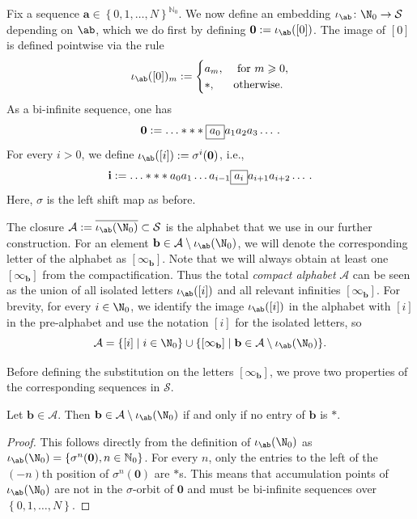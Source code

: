 %
%
%
%


Fix a sequence $\mathbf a\in \left\{0,1,\ldots,N\right\}^{\mathbb{N}_0}$. We now define an embedding $\iota_{\ab}\colon \N_0\to \mathcal{S}$ depending on $\ab$, which we do first by defining $\mathbf 0:=\iota_{\ab}([0])$. The image of $[0]$ is defined pointwise via the rule
\[
\iota_{\ab}([0])_m:=\begin{cases}
a_m,& \text{ for } m\geqslant 0, \\
*,& \text{otherwise}.
\end{cases}
\]
As a bi-infinite sequence, one has 
$$\mathbf 0:=\ldots ***\fbox{$a_0$}a_1a_2a_3\ldots\,.$$  For every $i>0$, we define $\iota_{\ab}([i]):=\sigma^{i}(\mathbf 0)$, i.e., 
$$\mathbf i:=\ldots ***a_0a_1\ldots a_{i-1}\fbox{$a_i$}a_{i+1}a_{i+2}\ldots\,.$$
Here, $\sigma$ is the left shift map as before. 

The closure $\mathcal{A}:=\overline{\iota_{\ab}(\N_0)} \subset \mathcal S$ is the alphabet that we use in our further construction. For an element $\mathbf b\in \mathcal{A}\setminus \iota_{\ab}(\N_0)$, we will denote the corresponding letter of the alphabet as $[\infty_\mathbf b]$. Note that we will always obtain at least one $[\infty_{\mathbf b}]$ from the compactification. Thus the total {\it compact alphabet} $\mathcal{A}$ can be seen as the union of all isolated letters $\iota_{\ab}([i])$ and all relevant infinities $[\infty_\mathbf b]$. For brevity, for every $i\in \N_0$, we identify the image $\iota_{\ab}([i])$ in the alphabet with $[i]$ in the pre-alphabet and use the notation $[i]$ for the isolated letters, so 
$$\mathcal{A}=\{[i]\mid i\in \N_0\}\cup \{[\infty_\mathbf b]\mid\mathbf b\in \mathcal{A}\setminus \iota_{\ab}(\N_0)\}.$$

Before defining the substitution on the letters $[\infty_\mathbf b]$, we prove two properties of the corresponding sequences in $\mathcal S$.

\begin{lem}\label{lem:nostar}
Let $\mathbf{b}\in \mathcal{A}$. 
Then $\mathbf b\in \mathcal{A}\setminus \iota_{\ab}(\N_0)$ if and only if no entry of $\mathbf b$ is $*$.
\end{lem}
\begin{proof}
This follows directly from the definition of $\iota_{\ab}(\N_0)$ as $\iota_{\ab}(\N_0)=\left\{\sigma^{n}(\mathbf{0}),n\in\mathbb{N}_0\right\}$. For every $n$, only the entries to the left of the $(-n)$th position of $\sigma^n(\mathbf 0)$ are $*$s. This means that accumulation points of $\iota_{\ab}(\N_0)$ are not in the $\sigma$-orbit of $\mathbf{0}$  and must be bi-infinite sequences over $\left\{0,1,\ldots,N \right\}$.
\end{proof}

